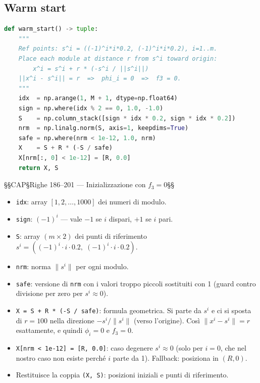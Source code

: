 \documentclass[12pt,a4paper]{article}
\theoremstyle{definition}
\begin{document}
\subsection{Warm start}

\begin{lstlisting}[language=Python]
def warm_start() -> tuple:
    """
    Ref points: s^i = ((-1)^i*i*0.2, (-1)^i*i*0.2), i=1..m.
    Place each module at distance r from s^i toward origin:
        x^i = s^i + r * (-s^i / ||s^i||)
    ||x^i - s^i|| = r  =>  phi_i = 0  =>  f3 = 0.
    """
    idx  = np.arange(1, M + 1, dtype=np.float64)
    sign = np.where(idx % 2 == 0, 1.0, -1.0)
    S    = np.column_stack([sign * idx * 0.2, sign * idx * 0.2])
    nrm  = np.linalg.norm(S, axis=1, keepdims=True)
    safe = np.where(nrm < 1e-12, 1.0, nrm)
    X    = S + R * (-S / safe)
    X[nrm[:, 0] < 1e-12] = [R, 0.0]
    return X, S
\end{lstlisting}

§§CAP§Righe 186–201 — Inizializzazione con $f_3 = 0$§§



\begin{itemize}[nosep]
  \item \texttt{idx}: array $[1, 2, \ldots, 1000]$ dei numeri di modulo.
  \item \texttt{sign}: $(-1)^i$ — vale $-1$ se $i$ dispari, $+1$ se $i$ pari.
  \item \texttt{S}: array $(m \times 2)$ dei punti di riferimento
        $s^i = ((-1)^i \cdot i \cdot 0.2,\; (-1)^i \cdot i \cdot 0.2)$.
  \item \texttt{nrm}: norma $\|s^i\|$ per ogni modulo.
  \item \texttt{safe}: versione di \texttt{nrm} con i valori troppo piccoli sostituiti con 1
        (guard contro divisione per zero per $s^i \approx 0$).
  \item \texttt{X = S + R * (-S / safe)}: formula geometrica. Si parte da $s^i$ e ci si sposta
        di $r = 100$ nella direzione $-s^i / \|s^i\|$ (verso l'origine).
        Così $\|x^i - s^i\| = r$ esattamente, e quindi $\phi_i = 0$ e $f_3 = 0$.
  \item \texttt{X[nrm < 1e-12] = [R, 0.0]}: caso degenere $s^i \approx 0$ (solo per $i=0$,
        che nel nostro caso non esiste perché $i$ parte da 1). Fallback: posiziona in $(R, 0)$.
  \item Restituisce la coppia \texttt{(X, S)}: posizioni iniziali e punti di riferimento.
\end{itemize}
\end{document}
